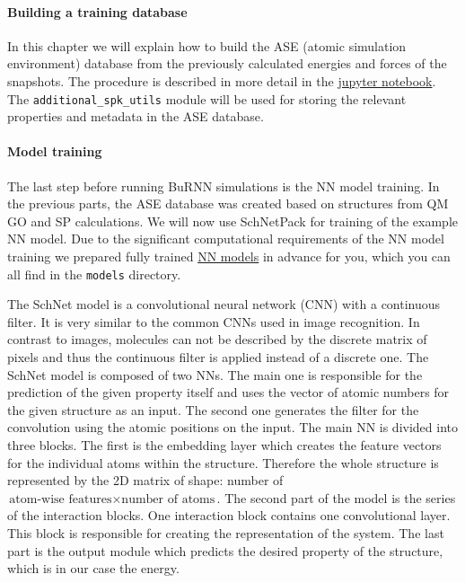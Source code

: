 \paragraph{Building a training database}
In this chapter we will explain how to build the ASE (atomic simulation environment) \cite{Larsen2017ASE} database from the previously calculated energies and forces of the snapshots. The procedure is described in more detail in the \href{https://github.com/LierB/gromos_tutorial_livecoms/blob/burnn_tutorial_rc/tutorial_files/t_06/train_dataset_tutorial/tutorial_v2.ipynb}{jupyter notebook}. The \texttt{additional\_spk\_utils} module will be used for storing the relevant properties and metadata in the ASE database. 


\paragraph{Model training}
The last step before running BuRNN simulations is the NN model training. In the previous parts, the ASE database was created based on structures from QM GO and SP calculations. We will now use SchNetPack for training of the example NN model. Due to the significant computational requirements of the NN model training we prepared fully trained \href{https://github.com/LierB/gromos_tutorial_livecoms/tree/burnn_tutorial_rc/tutorial_files/t_06/models}{NN models} in advance for you, which you can all find in the \texttt{models} directory. 


The SchNet model \cite{Schuett2018SchNet} is a convolutional neural network (CNN) with a continuous filter. It is very similar to the common CNNs used in image recognition. In contrast to images, molecules can not be described by the discrete matrix of pixels and thus the continuous filter is applied instead of a discrete one. The SchNet model is composed of two NNs. The main one is responsible for the prediction of the given property itself and uses the vector of atomic numbers for the given structure as an input. The second one generates the filter for the convolution using the atomic positions on the input. The main NN is divided into three blocks. The first is the embedding layer which creates the feature vectors for the individual atoms within the structure. Therefore the whole structure is represented by the 2D matrix of shape: number of $\text{atom-wise features}\times \text{number of atoms}$. The second part of the model is the series of the interaction blocks. One interaction block contains one convolutional layer. This block is responsible for creating the representation of the system. The last part is the output module which predicts the desired property of the structure, which is in our case the energy.

